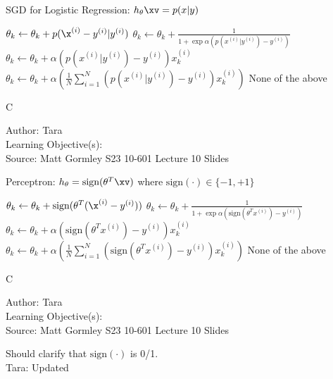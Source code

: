 \begin{parts}
\begin{subparts}
\subpart SGD for Logistic Regression: $h_{\theta}\xv = p(x|y)$\\
    {%
    \checkboxchar{$\Box$} \checkedchar{$\blacksquare$} %
    \begin{checkboxes}
     \choice $\theta_k \leftarrow \theta_k + p(\x^{(i)} - y^{(i)}|y^{(i)})$
     \choice $\theta_k \leftarrow \theta_k + \frac{1}{1 + \exp \alpha(p(x^{(i)}| y^{(i)}) - y^{(i)} )}$
     \choice $\theta_k \leftarrow \theta_k + \alpha(p(x^{(i)}|y^{(i)})-y^{(i)})x_k^{(i)}$
     \choice $\theta_k \leftarrow \theta_k + \alpha \left(\frac{1}{N} \sum_{i=1}^{N} \left(p(x^{(i)}|y^{(i)}) - y^{(i)}\right) x_k^{(i)}  \right)$
     \choice None of the above
    \end{checkboxes}
    }
    \begin{soln}
    C
    \end{soln}
    \begin{qauthor}
    Author: Tara\\
    Learning Objective(s): \\
    Source: Matt Gormley S23 10-601 Lecture 10 Slides
    \end{qauthor}
\subpart Perceptron: $h_{\theta} = \text{sign}(\theta ^T \xv)$ where $\text{sign}(\cdot) \in \{-1, +1\}$ \\
    {%
    \checkboxchar{$\Box$} \checkedchar{$\blacksquare$} %
    \begin{checkboxes}
     \choice $\theta_k \leftarrow \theta_k + \text{sign}(\theta^T(\x^{(i)} - y^{(i)}))$
     \choice $\theta_k \leftarrow \theta_k + \frac{1}{1 + \exp \alpha(\text{sign}(\theta^Tx^{(i)}) - y^{(i)})}$
     \choice $\theta_k \leftarrow \theta_k + \alpha(\text{sign}(\theta^Tx^{(i)})-y^{(i)})x_k^{(i)}$
      \choice $\theta_k \leftarrow \theta_k + \alpha \left(\frac{1}{N} \sum_{i=1}^{N} \left(\text{sign}(\theta^Tx^{(i)}) - y^{(i)}\right)x_k^{(i)}  \right)$
     \choice None of the above
    \end{checkboxes}
    }
    \begin{soln}
    C
    \end{soln}
    \begin{qauthor}
    Author: Tara\\
    Learning Objective(s): \\
    Source: Matt Gormley S23 10-601 Lecture 10 Slides\\
    \end{qauthor}
    \begin{qtester}
    Should clarify that $\text{sign}(\cdot)$ is 0/1.\\
    Tara: Updated
    \end{qtester}
\end{subparts}



\end{parts}
